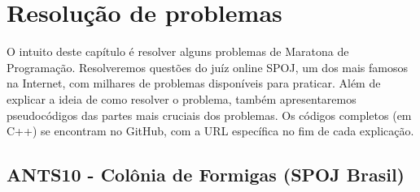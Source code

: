 \chapter{Resolução de problemas}
\label{cap:resolucao-problemas}

O intuito deste capítulo é resolver alguns problemas de Maratona de Programação. Resolveremos questões do juíz online SPOJ, um dos mais famosos na Internet, com milhares de problemas disponíveis para praticar. Além de explicar a ideia de como resolver o problema, também apresentaremos pseudocódigos das partes mais cruciais dos problemas. Os códigos completos (em C++) se encontram no GitHub, com a URL específica no fim de cada explicação.

\section{ANTS10 - Colônia de Formigas  (SPOJ Brasil)}

